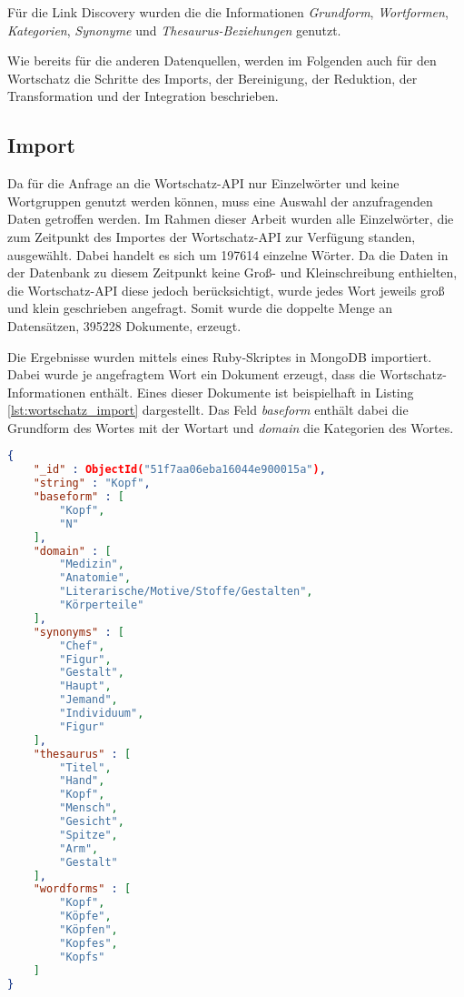 Für die Link Discovery wurden die die Informationen \emph{Grundform}, \emph{Wortformen}, \emph{Kategorien}, \emph{Synonyme} und \emph{Thesaurus-Beziehungen} genutzt.

Wie bereits für die anderen Datenquellen, werden im Folgenden auch für den Wortschatz die Schritte des Imports, der Bereinigung, der Reduktion, der Transformation und der Integration beschrieben.

\subsection{Import}

Da für die Anfrage an die Wortschatz-API nur Einzelwörter und keine Wortgruppen genutzt werden können, muss eine Auswahl der anzufragenden Daten getroffen werden. Im Rahmen dieser Arbeit wurden alle Einzelwörter, die zum Zeitpunkt des Importes der Wortschatz-API zur Verfügung standen, ausgewählt. Dabei handelt es sich um \num{197614} einzelne Wörter. Da die Daten in der Datenbank zu diesem Zeitpunkt keine Groß- und Kleinschreibung enthielten, die Wortschatz-API diese jedoch berücksichtigt, wurde jedes Wort jeweils groß und klein geschrieben angefragt. Somit wurde die doppelte Menge an Datensätzen, \num{395228} Dokumente, erzeugt.

Die Ergebnisse wurden mittels eines Ruby-Skriptes in MongoDB importiert. Dabei wurde je angefragtem Wort ein Dokument erzeugt, dass die Wortschatz-Informationen enthält. Eines dieser Dokumente ist beispielhaft in Listing \ref{lst:wortschatz_import} dargestellt. Das Feld \emph{baseform} enthält dabei die Grundform des Wortes mit der Wortart und \emph{domain} die Kategorien des Wortes.

\begin{lstlisting}[language=json, label={lst:wortschatz_import}, caption={Wortschatz-Dokument nach dem Import}]
{
    "_id" : ObjectId("51f7aa06eba16044e900015a"),
    "string" : "Kopf",
    "baseform" : [ 
        "Kopf", 
        "N"
    ],
    "domain" : [ 
        "Medizin", 
        "Anatomie", 
        "Literarische/Motive/Stoffe/Gestalten", 
        "Körperteile"
    ],
    "synonyms" : [  
        "Chef", 
        "Figur", 
        "Gestalt", 
        "Haupt", 
        "Jemand", 
        "Individuum", 
        "Figur"
    ],
    "thesaurus" : [ 
        "Titel", 
        "Hand", 
        "Kopf", 
        "Mensch", 
        "Gesicht", 
        "Spitze", 
        "Arm", 
        "Gestalt"
    ],
    "wordforms" : [ 
        "Kopf", 
        "Köpfe", 
        "Köpfen", 
        "Kopfes", 
        "Kopfs"
    ]
}
\end{lstlisting}

